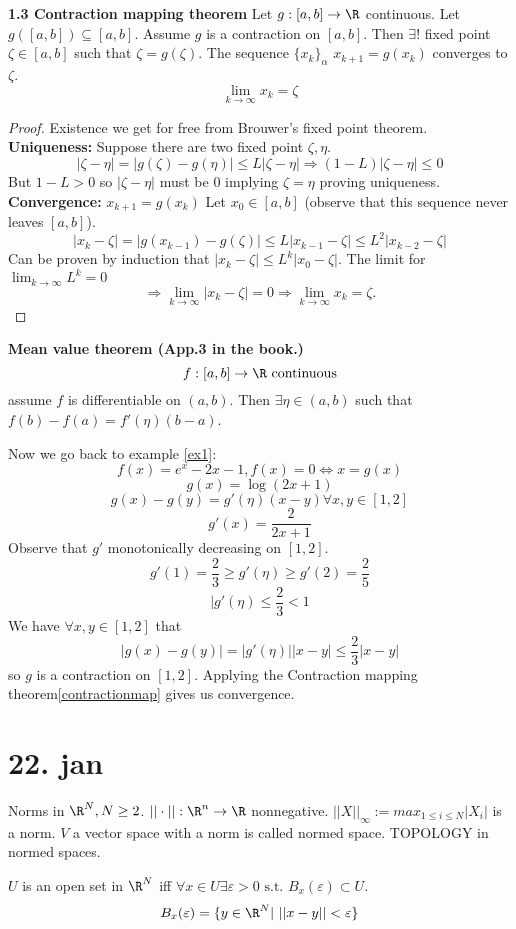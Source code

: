 \begin{theorem}\label{contractionmap}
  \textbf{1.3 Contraction mapping theorem}
  \newline
  Let $g:[a,b]\to \R$ continuous.
  Let $g([a,b])\subseteq [a,b]$.
  Assume $g$ is a contraction on $[a,b]$.
  \newline
  Then $\exists !$ fixed point $\zeta \in [a,b]$ such that $\zeta=g(\zeta)$. The sequence $\{x_k\}_\alpha$ $x_{k+1}=g(x_k)$ converges to $\zeta$.
    $$\lim_{k\to\infty}x_k=\zeta$$
\end{theorem}
\begin{proof}
  Existence we get for free from Brouwer's fixed point theorem.
  \newline
  \textbf{Uniqueness:} Suppose there are two fixed point $\zeta,\eta$.
    $$|\zeta-\eta|=|g(\zeta)-g(\eta)|\leq L|\zeta-\eta| \Rightarrow (1-L)|\zeta-\eta|\leq 0$$
    But $1-L>0$ so $|\zeta-\eta|$ must be $0$ implying $\zeta=\eta$ proving uniqueness.
  \newline
  \textbf{Convergence:} $x_{k+1}=g(x_k)$ Let $x_0\in [a,b]$ (observe that this sequence never leaves $[a,b]$).
    $$|x_k-\zeta|=|g(x_{k-1})-g(\zeta)|\leq L|x_{k-1}-\zeta|\leq L^2|x_{k-2}-\zeta|$$
  Can be proven by induction that $|x_{k}-\zeta|\leq L^k|x_0-\zeta|$. The limit for $\lim_{k\to\infty}L^k=0$
    $$\Rightarrow \lim_{k\to\infty}|x_k-\zeta|=0 \Rightarrow \lim_{k\to\infty}x_k=\zeta.$$
\end{proof}
\begin{theorem}
  \textbf{Mean value theorem (App.3 in the book.)}
    $$f:[a,b]\to \R \text{ continuous}$$
  assume $f$ is differentiable on $(a,b)$.
  \newline
  Then $\exists \eta \in (a,b)$ such that $f(b)-f(a)=f'(\eta)(b-a)$.
\end{theorem}
Now we go back to example \ref{ex1}:
  $$f(x)=e^x-2x-1, f(x)=0 \Leftrightarrow x=g(x)$$
  $$g(x)=\log(2x+1)$$
  $$g(x)-g(y)=g'(\eta)(x-y) \forall x,y\in [1,2]$$
  $$g'(x)=\frac{2}{2x+1}$$
Observe that $g'$ monotonically decreasing on $[1,2]$.
  $$g'(1)=\frac{2}{3}\geq g'(\eta)\geq g'(2)=\frac{2}{5}$$
  $$|g'(\eta)\leq \frac{2}{3}<1$$
We have $\forall x,y\in [1,2]$ that
  $$|g(x)-g(y)|=|g'(\eta)||x-y|\leq \frac{2}{3}|x-y|$$
so $g$ is a contraction on $[1,2]$. Applying the Contraction mapping theorem\ref{contractionmap} gives us convergence.

\section*{22. jan}
Norms in $\R^N, N\geq 2$.
\newline $|| \cdot ||: \R^n \to \R$ nonnegative.
\newline $|| X ||_{\infty}:=max_{1\leq i \leq N}|X_i|$ is a norm.
\newline $V$ a vector space with a norm is called normed space. TOPOLOGY in normed spaces.
\begin{definition}
  $U$ is an open set in $\R^N$ iff $\forall x\in U \exists \varepsilon >0 \text{ s.t. } B_x(\varepsilon)\subset U$.
  $$B_x(\varepsilon)=\{ y\in \R^N | ||x-y|| <\varepsilon \}$$
\end{definition}

